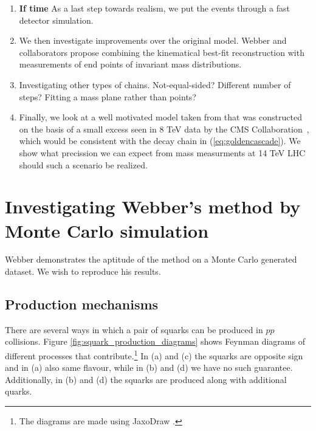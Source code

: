 \documentclass[twoside,english]{uiofysmaster}
\begin{document}
\begin{enumerate}
	\item {\bf If time} As a last step towards realism, we put the events through a fast detector simulation. 
	\item We then investigate improvements over the original model. Webber and collaborators \cite{Nojiri:2010dk} propose combining the kinematical best-fit reconstruction with measurements of end points of invariant mass distributions.
	\item Investigating other types of chains. Not-equal-sided? Different number of steps? Fitting a mass plane rather than points?
	\item Finally, we look at a well motivated model taken from \cite{Allanach:2014gsa} that was constructed on the basis of a small excess seen in 8 TeV data by the CMS Collaboration~\cite{CMS:2014jfa}, which would be consistent with the decay chain in (\ref{eq:goldencascade}). We show what precission we can expect from mass measurments at 14 TeV LHC should such a scenario be realized.
\end{enumerate}







\chapter{Investigating Webber's method by Monte Carlo simulation}
\label{ch:MC}
Webber demonstrates the aptitude of the method on a Monte Carlo generated dataset. We wish to reproduce his results. 

\section{Production mechanisms}
There are several ways in which a pair of squarks can be produced in $pp$ collisions. Figure \ref{fig:squark_production_diagrams} shows Feynman diagrams of different processes that contribute.\footnote{The diagrams are made using JaxoDraw \cite{Binosi:2003yf}.} In (a) and (c) the squarks are opposite sign and in (a) also same flavour, while in (b) and (d) we have no such guarantee. Additionally, in (b) and (d) the squarks are produced along with additional quarks.
\end{document}
